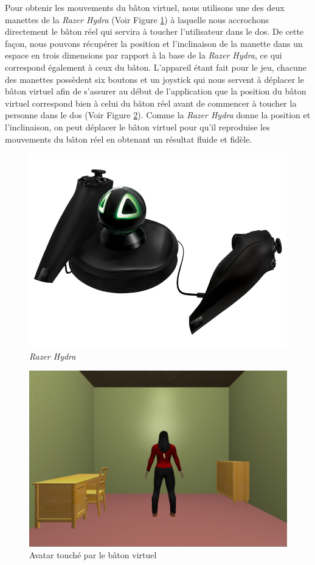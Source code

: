 Pour obtenir les mouvements du bâton virtuel, nous utilisons une des deux manettes de la \emph{Razer Hydra}  (Voir Figure \ref{Razer}) à laquelle nous accrochons directement le bâton réel qui servira à toucher l'utilisateur dans le dos. De cette façon, nous pouvons récupérer la position et l'inclinaison de la manette dans un espace en trois dimensions par rapport à la base de la \emph{Razer Hydra}, ce qui correspond également à ceux du bâton. L'appareil étant fait pour le jeu, chacune des manettes possèdent six boutons et un joystick qui nous servent à déplacer le bâton virtuel afin de s'assurer au début de l'application que la position du bâton virtuel correspond bien à celui du bâton réel avant de commencer à toucher la personne dans le dos (Voir Figure \ref{batonAvatar}). Comme la \emph{Razer Hydra} donne la position et l'inclinaison, on peut déplacer le bâton virtuel pour qu'il reproduise les mouvements du bâton réel en obtenant un résultat fluide et fidèle.
\begin{figure}[!h]
   	\centerline{\includegraphics[scale=0.2]{images/biblio/razerHydra}}
  	\caption{\label{Razer} \emph{Razer Hydra}}
\end{figure}
\begin{figure}[!h]
   	\centerline{\includegraphics[scale=0.5]{images/avatarBaton2}}
   	\caption{\label{batonAvatar} Avatar touché par le bâton virtuel }
\end{figure}
